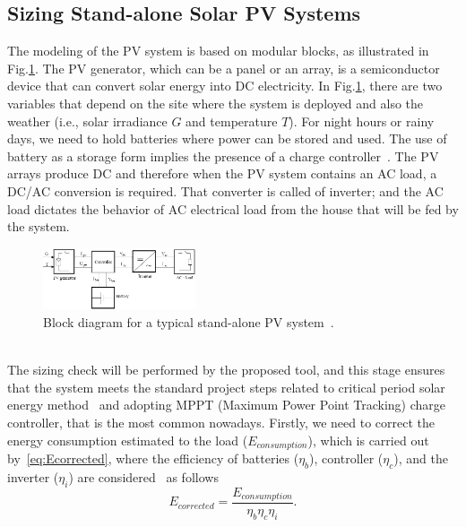 \documentclass[10pt,conference]{IEEEtran}
\begin{document}
\subsection{Sizing Stand-alone Solar PV Systems}
\label{sec:sizing}
The modeling of the PV system is based on modular blocks, as illustrated in Fig.\ref{fig:blockdiagram}. %
The PV generator, which can be a panel or an array, is a semiconductor device that can convert solar energy into DC electricity. In Fig.\ref{fig:blockdiagram}, there are two variables that depend on the site where the system is deployed and also the weather (i.e., solar irradiance $G$ and temperature $T$). For night hours or rainy days, we need to hold batteries where power can be stored and used. The use of battery as a storage form implies the presence of a charge controller~\cite{Hansen}. The PV arrays produce DC and therefore when the PV system contains an AC load, a DC/AC conversion is required. That converter is called of inverter; and the AC load dictates the behavior of AC electrical load from the house that will be fed by the system.
\begin{figure}[h]
\includegraphics[width=0.4\textwidth]{blockdiagramPVS2}
\centering
\caption{Block diagram for a typical stand-alone PV system~\cite{Hansen}.}
\label{fig:blockdiagram} 
\end{figure}
\\

The sizing check will be performed by the proposed tool, and this stage ensures that the system meets the standard project steps related to critical period solar energy method~\cite{Pinho} and adopting MPPT (Maximum Power Point Tracking) charge controller, that is the most common nowadays. 
%
Firstly, we need to correct the energy consumption estimated to the load ($E_{consumption}$), which is carried out by~\eqref{eq:Ecorrected}, where the efficiency of batteries ($\eta_{b}$), controller ($\eta_{c}$), and the inverter ($\eta_{i}$) are considered~\cite{Pinho} as follows
\begin{equation}
\label{eq:Ecorrected}
\scriptstyle E_{corrected} = \dfrac{\scriptstyle E_{consumption}}{ \scriptstyle \eta_{b} \eta_{c} \eta_{i} }.
\end{equation}
\end{document}
